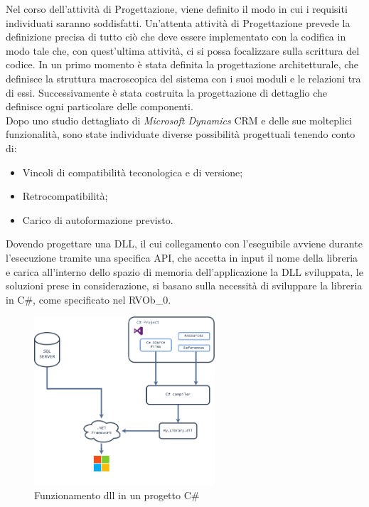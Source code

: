 Nel corso dell'attività di Progettazione, viene definito il modo in cui i requisiti individuati saranno soddisfatti.
Un'attenta attività di Progettazione prevede la definizione precisa di tutto ciò che deve essere implementato con la codifica in modo tale che, con quest’ultima attività, ci si possa focalizzare sulla scrittura del codice. 
In un primo momento è stata definita la progettazione architetturale, che definisce la struttura macroscopica del sistema con i suoi moduli e le relazioni tra di essi. Successivamente è stata costruita la progettazione di dettaglio che definisce ogni particolare delle componenti.
\\

Dopo uno studio dettagliato di \emph{Microsoft Dynamics} CRM e delle sue molteplici funzionalità, sono state individuate diverse possibilità progettuali tenendo conto di:
\begin{itemize}
    \item Vincoli di compatibilità teconologica e di versione;
    \item Retrocompatibilità;
    \item Carico di autoformazione previsto.
\end{itemize}
Dovendo progettare una DLL, il cui collegamento con l'eseguibile avviene durante l'esecuzione tramite una specifica API, che accetta in input il nome della libreria e carica all'interno dello spazio di memoria dell'applicazione la DLL sviluppata, le soluzioni prese in considerazione, si basano sulla necessità di sviluppare la libreria in C\#, come specificato nel RVOb\_0. 
     \begin{figure}[H]
        \centering
        \captionsetup{justification=centering,margin=2cm}
            \includegraphics[width=0.6\textwidth ]{figures/powershellarch.png}
            \caption [Funzionamento dll in un progetto C\#]{Funzionamento dll in un progetto C\#\label{fig:dllfunzione}}
    \end{figure}
